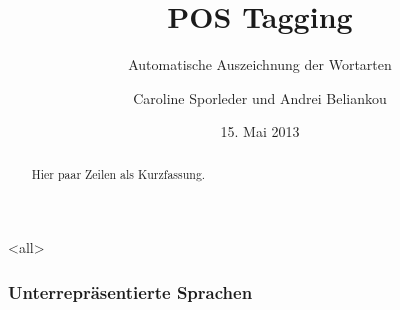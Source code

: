 
\usepackage[utf8]{inputenc}
\usepackage[T2A, T1]{fontenc}

\usepackage[russian, american, ngerman]{babel}
\usepackage{textcomp}              %
\usepackage{mathptmx}              %
\usepackage[scaled=.90]{helvet}    %
\usepackage{courier}               %
\usepackage{amsmath}               %
\usepackage{amsthm}                %

\usepackage{tabularx}

\usepackage{biblatex}


\usepackage{multicol}

\usepackage{graphicx}
\graphicspath{{images/}}

\usepackage{qtree}

\usepackage{hyperref}


\mode*

\mode<all>{
  \title[POS]{POS Tagging}
  \subtitle{Automatische Auszeichnung der Wortarten}
  \author[C.\,Sporleder \& A.\,Beliankou]{Caroline
    Sporleder und Andrei Beliankou}
  \date[15.05.2013]{15. Mai 2013}
}

\maketitle

\begin{abstract}
  Hier paar Zeilen als Kurzfassung.
\end{abstract}

\tableofcontents

\begin{frame}
  \titlepage
\end{frame}

\begin{frame}
  \frametitle{Unterrepräsentierte Sprachen}

\end{frame}

